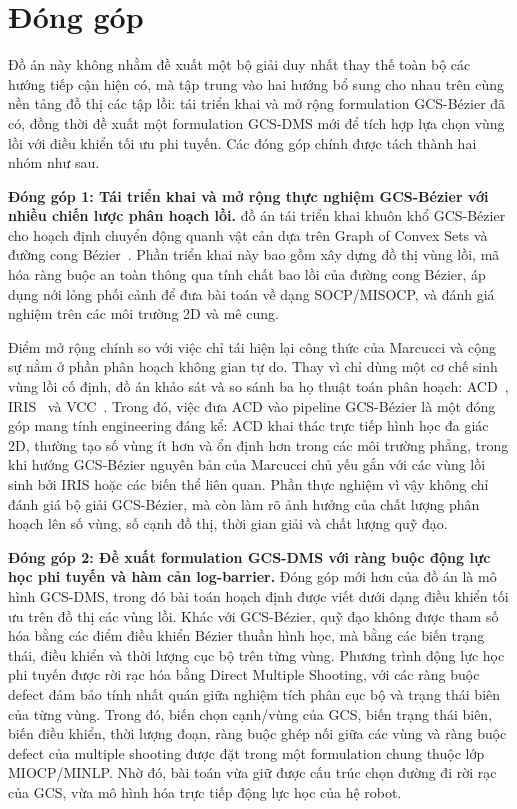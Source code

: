 \section{Đóng góp}

Đồ án này không nhằm đề xuất một bộ giải duy nhất thay thế toàn bộ các hướng tiếp cận hiện có, mà tập trung vào hai hướng bổ sung cho nhau trên cùng nền tảng đồ thị các tập lồi: tái triển khai và mở rộng formulation GCS-Bézier đã có, đồng thời đề xuất một formulation GCS-DMS mới để tích hợp lựa chọn vùng lồi với điều khiển tối ưu phi tuyến. Các đóng góp chính được tách thành hai nhóm như sau.

\textbf{Đóng góp 1: Tái triển khai và mở rộng thực nghiệm GCS-Bézier với nhiều chiến lược phân hoạch lồi.}
đồ án tái triển khai khuôn khổ GCS-Bézier cho hoạch định chuyển động quanh vật cản dựa trên Graph of Convex Sets và đường cong Bézier~\cite{MarcucciEtAl2023GCS,MarcucciEtAl2023MotionPlanning}. Phần triển khai này bao gồm xây dựng đồ thị vùng lồi, mã hóa ràng buộc an toàn thông qua tính chất bao lồi của đường cong Bézier, áp dụng nới lỏng phối cảnh để đưa bài toán về dạng SOCP/MISOCP, và đánh giá nghiệm trên các môi trường 2D và mê cung.

Điểm mở rộng chính so với việc chỉ tái hiện lại công thức của Marcucci và cộng sự nằm ở phần phân hoạch không gian tự do. Thay vì chỉ dùng một cơ chế sinh vùng lồi cố định, đồ án khảo sát và so sánh ba họ thuật toán phân hoạch: ACD~\cite{LienAmato2006}, IRIS~\cite{DeitsTedrake2014} và VCC~\cite{DeitsTedrake2023VCC}. Trong đó, việc đưa ACD vào pipeline GCS-Bézier là một đóng góp mang tính engineering đáng kể: ACD khai thác trực tiếp hình học đa giác 2D, thường tạo số vùng ít hơn và ổn định hơn trong các môi trường phẳng, trong khi hướng GCS-Bézier nguyên bản của Marcucci chủ yếu gắn với các vùng lồi sinh bởi IRIS hoặc các biến thể liên quan. Phần thực nghiệm vì vậy không chỉ đánh giá bộ giải GCS-Bézier, mà còn làm rõ ảnh hưởng của chất lượng phân hoạch lên số vùng, số cạnh đồ thị, thời gian giải và chất lượng quỹ đạo.

\textbf{Đóng góp 2: Đề xuất formulation GCS-DMS với ràng buộc động lực học phi tuyến và hàm cản log-barrier.}
Đóng góp mới hơn của đồ án là mô hình GCS-DMS, trong đó bài toán hoạch định được viết dưới dạng điều khiển tối ưu trên đồ thị các vùng lồi. Khác với GCS-Bézier, quỹ đạo không được tham số hóa bằng các điểm điều khiển Bézier thuần hình học, mà bằng các biến trạng thái, điều khiển và thời lượng cục bộ trên từng vùng. Phương trình động lực học phi tuyến được rời rạc hóa bằng Direct Multiple Shooting, với các ràng buộc defect đảm bảo tính nhất quán giữa nghiệm tích phân cục bộ và trạng thái biên của từng vùng. Trong đó, biến chọn cạnh/vùng của GCS, biến trạng thái biên, biến điều khiển, thời lượng đoạn, ràng buộc ghép nối giữa các vùng và ràng buộc defect của multiple shooting được đặt trong một formulation chung thuộc lớp MIOCP/MINLP. Nhờ đó, bài toán vừa giữ được cấu trúc chọn đường đi rời rạc của GCS, vừa mô hình hóa trực tiếp động lực học của hệ robot.

